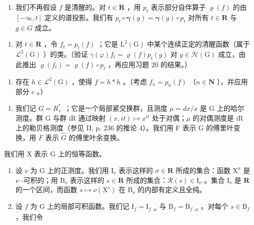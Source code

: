 \begin{enumerate}
\def\labelenumi{\alph{enumi})}
\setcounter{enumi}{3}
\tightlist
\item
  我们不再假设 \(f\) 是清醒的。对 \(t \in \mathbf{R}\) ，用 \(p_t\) 表示部分自伴算子 \(\varrho(f)\) 的由 \([- \infty, t]\) 定义的谱投影。我们有 \(p_t \circ \boldsymbol{\gamma}(g) = \boldsymbol{\gamma}(g) \circ p_t\) 对所有 \(t \in \mathbf{R}\) 与 \(g \in G\) 成立。
\end{enumerate}

\begin{enumerate}
\def\labelenumi{\alph{enumi})}
\setcounter{enumi}{4}
\tightlist
\item
  对 \(t \in \mathbf{R}\) ，令 \(f_t = p_t(f)\) ；它是 \(\mathrm{L}^2(\mathrm{G})\) 中某个连续正定的清醒函数（属于 \(\mathcal{L}^2(\mathrm{G})\) ）的类。（验证 \(\gamma(\varphi)f_t = \varrho(f)p_t(g)\) 对 \(g \in \mathcal{H}(\mathrm{G})\) 成立，由此推出 \(\varrho(f_t) = \varrho(f) \circ p_t\) ，再应用习题 20 的结果。）
\end{enumerate}

\begin{enumerate}
\def\labelenumi{\alph{enumi})}
\setcounter{enumi}{5}
\tightlist
\item
  存在 \(h \in \mathcal{L}^2(\mathrm{G})\) ，使得 \(f = h * h\) 。（考虑 \(f_n = p_n(f)\) （\(n \in \mathbf{N}\) ），并应用部分 \(c\) 。）
\end{enumerate}

\begin{enumerate}
\def\labelenumi{\arabic{enumi})}
\setcounter{enumi}{22}
\tightlist
\item
  我们记 \(G = R_{+}^{*}\) ；它是一个局部紧交换群，且测度 \(\mu = dx/x\) 是 G 上的哈尔测度。群 G 与群 iR 通过映射 \((x, it) \mapsto x^{it}\) 处于对偶；\(\mu\) 的对偶测度是 iR 上的勒贝格测度（参见 II, p. 236 的推论 4）。我们用 F 表示 G 的傅里叶变换，用 \(\overline{F}\) 表示 \(\widehat{G}\) 的傅里叶余变换。
\end{enumerate}

我们用 X 表示 G 上的恒等函数。

\begin{enumerate}
\def\labelenumi{\alph{enumi})}
\item
  设 \(\nu\) 为 G 上的正测度。我们用 \(\mathrm{I}_{\nu}\) 表示这样的 \(\sigma \in \mathbf{R}\) 所成的集合：函数 \(\mathrm{X}^{\sigma}\) 是 \(\nu\) -可积的；用 \(\mathrm{B}_{\nu}\) 表示这样的 \(s \in \mathbf{R}\) 所成的集合：\(\mathcal{R}(s) \in \mathrm{I}_{\nu}\) 。集合 \(\mathrm{I}_{\nu}\) 是 \(\mathbf{R}\) 的一个区间，而函数 \(s \mapsto \nu(\mathrm{X}^s)\) 在 \(\mathrm{B}_{\nu}\) 的内部有定义且全纯。
\item
  设 \(f\) 为 G 上的局部可积函数。我们记 \(\mathrm{I}_{f} = \mathrm{I}_{f\cdot \mu}\) 与 \(\mathrm{B}_f = \mathrm{B}_{f\cdot \mu}\) 。对每个 \(s \in \mathrm{B}_f\) ，我们令
\end{enumerate}

